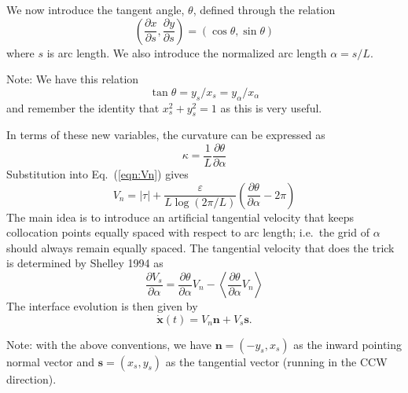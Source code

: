\documentclass[11pt]{article}
\newcommand{\abs}[1]{\left| #1 \right|}
\newcommand{\mean}[1]{\left< #1 \right>}
\newcommand{\eps}{\varepsilon}
\newcommand{\atau}{\abs{\tau}}
\newcommand{\xx}{{\mathbf{x}}}
\renewcommand{\ss}{{\mathbf{s}}}
\newcommand{\nn}{{\mathbf{n}}}
\newcommand{\pderiv}[2]{\frac{\partial #1}{\partial #2}}
\newcommand{\Vn}{V_n}
\newcommand{\Vs}{V_s}
\newcommand{\thalpha}{\pderiv{\theta}{\alpha}}
\begin{document}
We now introduce the tangent angle, $\theta$, defined through the relation
\begin{equation}
\left( \pderiv{x}{s}, \pderiv{y}{s} \right) = \left(\cos \theta, \sin \theta \right)
\end{equation}
where $s$ is arc length. We also introduce the normalized arc length $\alpha = s / L$. 

Note: We have this relation
\begin{equation}
\tan \theta = y_s/x_s = y_\alpha / x_\alpha
\end{equation}
and remember the identity that $x_s^2 + y_s^2 = 1$ as this is very useful.

In terms of these new variables, the curvature can be expressed as
\begin{equation}
\kappa = \frac{1}{L} \pderiv{\theta}{\alpha}
\end{equation}
Substitution into Eq.~(\ref{eqn:Vn}) gives
\begin{equation}
\label{eqn:Vn2}
\Vn = \atau + \frac{\eps}{L \log \left(2\pi/L \right)}  \left(\pderiv{\theta}{\alpha} - 2 \pi \right)
\end{equation}
The main idea is to introduce an artificial tangential velocity that keeps collocation points equally spaced with respect to arc length; i.e.~the grid of $\alpha$ should always remain equally spaced. The tangential velocity that does the trick is determined by Shelley 1994 as
\begin{equation}
\pderiv{\Vs}{\alpha} = \thalpha \Vn - \mean{\thalpha \Vn}
\end{equation}
The interface evolution is then given by
\begin{equation}
\dot{\xx}(t) = \Vn \nn + \Vs \ss.
\end{equation}

Note: with the above conventions, we have $\nn = (-y_s, x_s)$ as the inward pointing normal vector and $\ss = (x_s, y_s)$ as the tangential vector (running in the CCW direction). 
\end{document}
